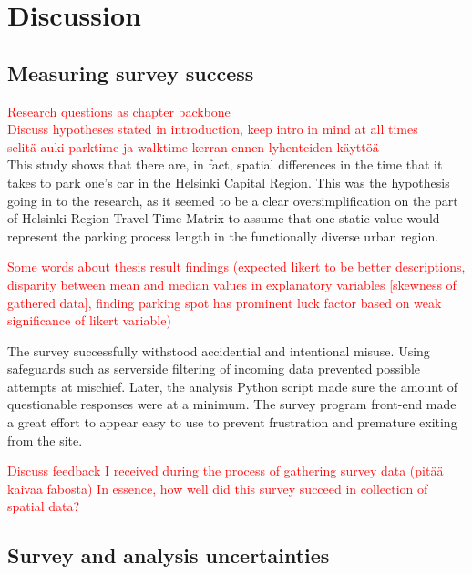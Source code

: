 \section{Discussion}
\subsection{Measuring survey success}
\justify

\textcolor{red}{Research questions as chapter backbone} \\
\textcolor{red}{Discuss hypotheses stated in introduction, keep intro in mind at all times}\\
\textcolor{red}{selitä auki parktime ja walktime kerran ennen lyhenteiden käyttöä}\\
This study shows that there are, in fact, spatial differences in the time that it takes to park one's car in the Helsinki Capital Region. This was the hypothesis going in to the research, as it seemed to be a clear oversimplification on the part of Helsinki Region Travel Time Matrix to assume that one static value would represent the parking process length in the functionally diverse urban region.

\textcolor{red}{Some words about thesis result findings (expected likert to be better descriptions, disparity between mean and median values in explanatory variables [skewness of gathered data], finding parking spot has prominent luck factor based on weak significance of likert variable)}

The survey successfully withstood accidential and intentional misuse. Using safeguards such as serverside filtering of incoming data prevented possible attempts at mischief. Later, the analysis Python script made sure the amount of questionable responses were at a minimum. The survey program front-end made a great effort to appear easy to use to prevent frustration and premature exiting from the site.

\textcolor{red}{Discuss feedback I received during the process of gathering survey data (pitää kaivaa fabosta) In essence, how well did this survey succeed in collection of spatial data?}

\newpage
\subsection{Survey and analysis uncertainties}
\justify

